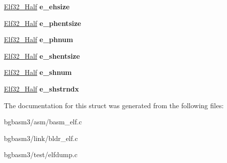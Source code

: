 \begin{DoxyCompactItemize}
\item 
\hypertarget{structElf32__Ehdr_a04c658023e50479eed64f6d1b00a2504}{\hyperlink{structElf32__Half}{Elf32\-\_\-\-Half} {\bfseries e\-\_\-ehsize}}\label{structElf32__Ehdr_a04c658023e50479eed64f6d1b00a2504}

\item 
\hypertarget{structElf32__Ehdr_afa2289f96d86fcc568a3b1f40cc8953e}{\hyperlink{structElf32__Half}{Elf32\-\_\-\-Half} {\bfseries e\-\_\-phentsize}}\label{structElf32__Ehdr_afa2289f96d86fcc568a3b1f40cc8953e}

\item 
\hypertarget{structElf32__Ehdr_a360898812db1655f8cb8258780d9df5b}{\hyperlink{structElf32__Half}{Elf32\-\_\-\-Half} {\bfseries e\-\_\-phnum}}\label{structElf32__Ehdr_a360898812db1655f8cb8258780d9df5b}

\item 
\hypertarget{structElf32__Ehdr_ab53c709a841960e499da68e2316ed428}{\hyperlink{structElf32__Half}{Elf32\-\_\-\-Half} {\bfseries e\-\_\-shentsize}}\label{structElf32__Ehdr_ab53c709a841960e499da68e2316ed428}

\item 
\hypertarget{structElf32__Ehdr_a11249bd7e61642742a68a3e7f69ac721}{\hyperlink{structElf32__Half}{Elf32\-\_\-\-Half} {\bfseries e\-\_\-shnum}}\label{structElf32__Ehdr_a11249bd7e61642742a68a3e7f69ac721}

\item 
\hypertarget{structElf32__Ehdr_a3b3070ccd7d971e8cb6ea58d4c6fab09}{\hyperlink{structElf32__Half}{Elf32\-\_\-\-Half} {\bfseries e\-\_\-shstrndx}}\label{structElf32__Ehdr_a3b3070ccd7d971e8cb6ea58d4c6fab09}

\end{DoxyCompactItemize}


The documentation for this struct was generated from the following files\-:\begin{DoxyCompactItemize}
\item 
bgbasm3/asm/basm\-\_\-elf.\-c\item 
bgbasm3/link/bldr\-\_\-elf.\-c\item 
bgbasm3/test/elfdump.\-c\end{DoxyCompactItemize}
